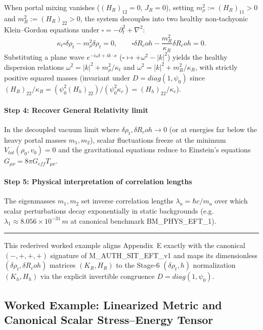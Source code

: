 \documentclass[american,11pt,letterpaper]{article}
\newcommand{\Rcoh}{R_{\mathrm{coh}}}
\def\mathbf#1{#1}%
\def\mathrm#1{#1}%
\def\texttt#1{#1}%
\def\Rcoh{R_coh}%
\begin{document}
When portal mixing vanishes ($(H_R)_{12} = 0$, $J_R = 0$), setting $m_\rho^2 := (H_R)_{11} > 0$ and $m_R^2 := (H_R)_{22} > 0$, the system decouples into two healthy non-tachyonic Klein--Gordon equations under $\square = -\partial_t^2 + \nabla^2$:
\[
\kappa_t \square \delta \rho_t - m_{\rho}^2 \delta \rho_t = 0,
\qquad
\square \delta \Rcoh - \frac{m_{R}^2}{\kappa_R} \delta \Rcoh = 0.
\]
Substituting a plane wave $e^{-i\omega t + i\mathbf{k}\cdot\mathbf{x}}$ ($\square \mapsto +\omega^2 - |\mathbf{k}|^2$) yields the healthy dispersion relations $\omega^2 = |\mathbf{k}|^2 + m_\rho^2/\kappa_t$ and $\omega^2 = |\mathbf{k}|^2 + m_R^2/\kappa_R$, with strictly positive squared masses (invariant under $D = \mathrm{diag}(1, \psi_0)$ since $(H_R)_{22}/\kappa_R = (\psi_0^2 (H_h)_{22})/(\psi_0^2 \kappa_c) = (H_h)_{22}/\kappa_c$).

\paragraph{Step 4: Recover General Relativity limit}

In the decoupled vacuum limit where $\delta\rho_t, \delta\Rcoh \to 0$ (or at energies far below the heavy portal masses $m_1, m_2$), scalar fluctuations freeze at the minimum $V_{\mathrm{tot}}(\rho_0, v_0) = 0$ and the gravitational equations reduce to Einstein's equations $G_{\mu\nu} = 8\pi G_{\mathrm{eff}} T_{\mu\nu}$.

\paragraph{Step 5: Physical interpretation of correlation lengths}

The eigenmasses $m_1, m_2$ set inverse correlation lengths $\lambda_a = \hbar c / m_a$ over which scalar perturbations decay exponentially in static backgrounds (e.g.\ $\lambda_1 \approx 8.056\times 10^{-31}\,\mathrm{m}$ at canonical benchmark \texttt{BM\_PHYS\_EFT\_1}).

\medskip\hrule\medskip
This rederived worked example aligns Appendix~E exactly with the canonical $(-,+,+,+)$ signature of \texttt{M\_AUTH\_SIT\_EFT\_v1} and maps its dimensionless $(\delta\rho_t, \delta\Rcoh)$ matrices $(K_R, H_R)$ to the Stage-6 $(\delta\rho_t, h)$ normalization $(K_h, H_h)$ via the explicit invertible congruence $D = \mathrm{diag}(1, \psi_0)$.

\subsection{Worked Example: Linearized Metric and Canonical Scalar Stress--Energy Tensor}
\end{document}
